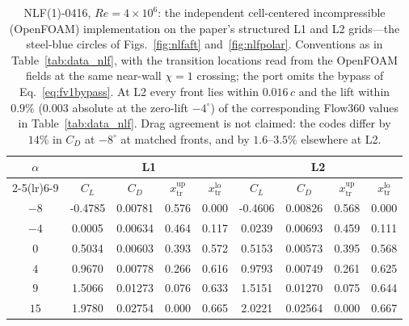 \begin{table}[tp]
  \centering\small
  \caption{NLF(1)-0416, $Re\!=\!4\!\times\!10^6$: the independent cell-centered incompressible (OpenFOAM) implementation on the paper's structured L1 and L2 grids---the steel-blue circles of Figs.~\ref{fig:nlfaft} and~\ref{fig:nlfpolar}. Conventions as in Table~\ref{tab:data_nlf}, with the transition locations read from the OpenFOAM fields at the same near-wall $\chi\!=\!1$ crossing; the port omits the bypass of Eq.~\ref{eq:fv1bypass}. At L2 every front lies within $0.016\,c$ and the lift within $0.9\%$ ($0.003$ absolute at the zero-lift $-4^\circ$) of the corresponding Flow360 values in Table~\ref{tab:data_nlf}. Drag agreement is not claimed: the codes differ by $14\%$ in $C_D$ at $-8^\circ$ at matched fronts, and by $1.6$--$3.5\%$ elsewhere at L2.}
  \label{tab:data_openfoam_nlf}
  \begin{tabular}{c cccc cccc}
    \toprule
    $\alpha$ & \multicolumn{4}{c}{L1} & \multicolumn{4}{c}{L2} \\ \cmidrule(lr){2-5}\cmidrule(lr){6-9} & $C_L$ & $C_D$ & $x_\mathrm{tr}^\mathrm{up}$ & $x_\mathrm{tr}^\mathrm{lo}$ & $C_L$ & $C_D$ & $x_\mathrm{tr}^\mathrm{up}$ & $x_\mathrm{tr}^\mathrm{lo}$ \\
    \midrule
    $-8$ & -0.4785 & 0.00781 & 0.576 & 0.000 & -0.4606 & 0.00826 & 0.568 & 0.000 \\
    $-4$ & 0.0005 & 0.00634 & 0.464 & 0.117 & 0.0239 & 0.00693 & 0.459 & 0.111 \\
    $0$ & 0.5034 & 0.00603 & 0.393 & 0.572 & 0.5153 & 0.00573 & 0.395 & 0.568 \\
    $4$ & 0.9670 & 0.00778 & 0.266 & 0.616 & 0.9793 & 0.00749 & 0.261 & 0.625 \\
    $9$ & 1.5066 & 0.01273 & 0.076 & 0.633 & 1.5151 & 0.01270 & 0.075 & 0.644 \\
    $15$ & 1.9780 & 0.02754 & 0.000 & 0.665 & 2.0221 & 0.02564 & 0.000 & 0.667 \\
    \bottomrule
  \end{tabular}
\end{table}
